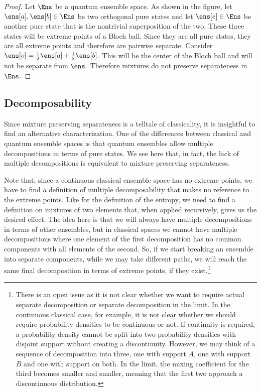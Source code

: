 \begin{mathSection}
\begin{proof}
	Let $\Ens$ be a quantum ensemble space. As shown in the figure, let $\ens[a], \ens[b] \in \Ens$ be two orthogonal pure states and let $\ens[e] \in \Ens$ be another pure state that is the nontrivial superposition of the two. These three states will be extreme points of a Bloch ball. Since they are all pure states, they are all extreme points and therefore are pairwise separate. Consider $\ens[o] = \frac{1}{2} \ens[a] + \frac{1}{2} \ens[b]$. This will be the center of the Bloch ball and will not be separate from $\ens$. Therefore mixtures do not preserve separateness in $\Ens$.
\end{proof}
\end{mathSection}

\subsection{Decomposability}

Since mixture preserving separateness is a telltale of classicality, it is insightful to find an alternative characterization. One of the differences between classical and quantum ensemble spaces is that quantum ensembles allow multiple decompositions in terms of pure states. We see here that, in fact, the lack of multiple decompositions is equivalent to mixture preserving separateness.

Note that, since a continuous classical ensemble space has no extreme points, we have to find a definition of multiple decomposability that makes no reference to the extreme points. Like for the definition of the entropy, we need to find a definition on mixtures of two elements that, when applied recursively, gives us the desired effect. The idea here is that we will always have multiple decompositions in terms of other ensembles, but in classical spaces we cannot have multiple decompositions where one element of the first decomposition has no common components with all elements of the second. So, if we start breaking an ensemble into separate components, while we may take different paths, we will reach the same final decomposition in terms of extreme points, if they exist.\footnote{There is an open issue as it is not clear whether we want to require actual separate decomposition or separate decomposition in the limit. In the continuous classical case, for example, it is not clear whether we should require probability densities to be continuous or not. If continuity is required, a probability density cannot be split into two probability densities with disjoint support without creating a discontinuity. However, we may think of a sequence of decomposition into three, one with support $A$, one with support $B$ and one with support on both. In the limit, the mixing coefficient for the third becomes smaller and smaller, meaning that the first two approach a discontinuous distribution.}

